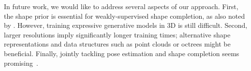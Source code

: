 In future work, we would like to address several aspects of our \AML approach. First, the shape prior is essential for weakly-supervised shape completion, as also noted by \cite{Gwak2017ARXIV}. However, training expressive generative models in 3D is still difficult. Second, larger resolutions imply significantly longer training times; alternative shape representations and data structures such as point clouds \citep{Qi2017CVPR,Qi2017NIPS,Fan2017CVPR} or octrees \citep{Riegler2017CVPR,Riegler2017THREEDV,Haene2017ARXIV} might be beneficial. Finally, jointly tackling pose estimation and shape completion seems promising~\citep{Engelmann2016GCPR}.